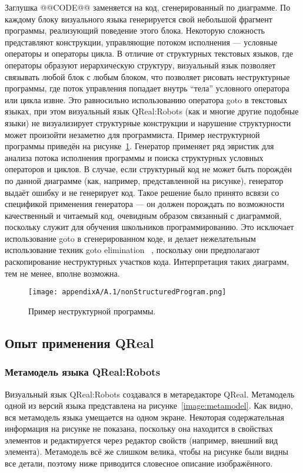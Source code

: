 Заглушка @@CODE@@ заменяется на код, сгенерированный по диаграмме. По каждому блоку 
визуального языка генерируется свой небольшой фрагмент программы, реализующий поведение 
этого блока. Некоторую сложность представляют конструкции, управляющие потоком исполнения 
--- условные операторы и операторы цикла. В отличие от структурных текстовых языков, 
где операторы образуют иерархическую структуру, визуальный язык позволяет связывать 
любой блок с любым блоком, что позволяет рисовать неструктурные программы, где поток 
управления попадает внутрь "`тела"' условного оператора или цикла извне. Это равносильно 
использованию оператора goto в текстовых языках, при этом визуальный язык QReal:Robots 
(как и многие другие подобные языки) не визуализирует структурные конструкции и нарушение 
структурности может произойти незаметно для программиста. Пример неструктурной программы 
приведён на рисунке~\ref{image:nonStructuredProgram}. Генератор применяет ряд эвристик 
для анализа потока исполнения программы и поиска структурных условных операторов и 
циклов. В случае, если структурный код не может быть порождён по данной диаграмме 
(как, например, представленной на рисунке), генератор выдаёт ошибку и не генерирует 
код. Такое решение было принято всвязи со спецификой применения генератора --- он 
должен порождать по возможности качественный и читаемый код, очевидным образом связанный 
с диаграммой, поскольку служит для обучения школьников программированию. Это исключает
использование goto в сгенерированном коде, и делает нежелательным использование техник goto elimination%
~\cite{terekhov2000reengineering}, поскольку они предполагают раскопирование неструктурных 
участков кода. Интерпретация таких диаграмм, тем не менее, вполне возможна.

\begin{figure} [ht]
	\begin{center}
		\texttt{[image: appendixA/A.1/nonStructuredProgram.png]}
		\caption{Пример неструктурной программы.}
		\label{image:nonStructuredProgram}
	\end{center}
\end{figure}

\subsection{Опыт применения QReal}
\subsubsection{Метамодель языка QReal:Robots}
Визуальный язык QReal:Robots создавался в метаредакторе QReal. Метамодель одной из 
версий языка представлена на рисунке~\ref{image:metamodel}. Как видно, вся метамодель 
языка умещается на одном экране. Некоторая содержательная информация на рисунке не 
показана, поскольку она находится в свойствах элементов и редактируется через редактор 
свойств (например, внешний вид элемента). Метамодель всё же слишком велика, чтобы на 
рисунке были видны все детали, поэтому ниже приводится словесное описание изображённого.

